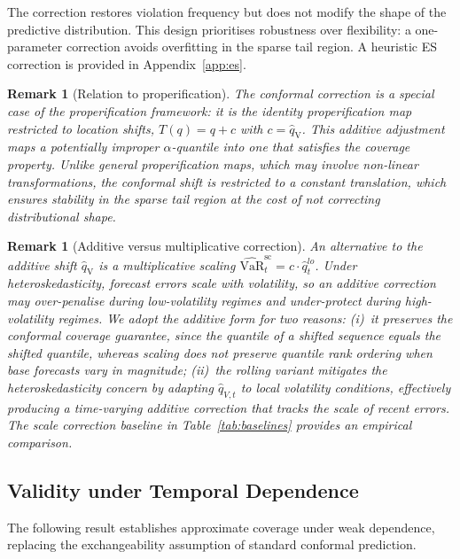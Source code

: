\documentclass[preprint,11pt,authoryear]{elsarticle}
\newtheorem{remark}[theorem]{Remark}
\newcommand{\VaR}{\mathrm{VaR}}
\newcommand{\1}{\boldsymbol{1}}
\newcommand{\qV}{\hat{q}_{\scriptscriptstyle\mathrm{V}}}
\begin{document}
	The correction restores violation frequency but does not
	modify the shape of the predictive distribution. This design
	prioritises robustness over flexibility: a one-parameter
	correction avoids overfitting in the sparse tail region. A
	heuristic ES correction is provided in
	Appendix~\ref{app:es}.
	
	\begin{remark}[Relation to properification]
		The conformal correction is a special case of the
		\citet{brehmer2021properification} properification framework:
		it is the identity properification map restricted to location
		shifts, $T(q) = q + c$ with $c = \qV$. This additive
		adjustment maps a potentially improper $\alpha$-quantile into
		one that satisfies the coverage property. Unlike general
		properification maps, which may involve non-linear
		transformations, the conformal shift is restricted to a
		constant translation, which ensures stability in the
		sparse tail region at the cost of not correcting
		distributional shape.
	\end{remark}
	
	\begin{remark}[Additive versus multiplicative correction]
		An alternative to the additive shift $\qV$ is a
		multiplicative scaling
		$\widehat{\VaR}_t^{\mathrm{sc}} = c \cdot
		\hat{q}_t^{lo}$. Under heteroskedasticity, forecast errors
		scale with volatility, so an additive correction may
		over-penalise during low-volatility regimes and
		under-protect during high-volatility regimes. We adopt the
		additive form for two reasons: (i)~it preserves the
		conformal coverage guarantee, since the quantile of a
		shifted sequence equals the shifted quantile, whereas
		scaling does not preserve quantile rank ordering when base
		forecasts vary in magnitude; (ii)~the rolling variant
		mitigates the heteroskedasticity concern by adapting
		$\hat{q}_{V,t}$ to local volatility conditions, effectively
		producing a time-varying additive correction that tracks the
		scale of recent errors. The scale correction baseline in
		Table~\ref{tab:baselines} provides an empirical comparison.
	\end{remark}
	
	\subsection{Validity under Temporal Dependence}
	\label{sec:validity}
	
	The following result establishes approximate coverage under
	weak dependence, replacing the exchangeability assumption of
	standard conformal prediction.
\end{document}
